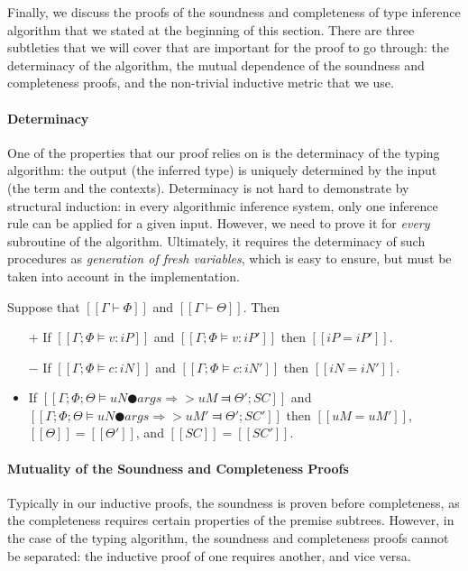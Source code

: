 Finally, we discuss the proofs of the soundness and completeness of type
inference algorithm that we stated at the beginning of this section.
There are three subtleties that we will cover that are important 
for the proof to go through: the determinacy of the algorithm,
the mutual dependence of the soundness and completeness proofs, and
the non-trivial inductive metric that we use.


\paragraph{Determinacy}
    One of the properties that our proof relies on is the determinacy of the 
    typing algorithm: the output (the inferred type)
    is uniquely determined by the input (the term and the contexts).
    Determinacy is not hard to demonstrate by structural induction: 
    in every algorithmic inference system, only one inference rule can be applied 
    for a given input.  However, we need to prove it for \emph{every} 
    subroutine of the algorithm. Ultimately, it requires 
    the determinacy of such procedures as \emph{generation of fresh variables}, 
    which is easy to ensure, but must be taken into account in the implementation.

\begin{lemma*}
    Suppose that $[[Γ ⊢ Φ]]$ and $[[Γ ⊢ Θ]]$. Then 
    \begin{itemize}
        \item [$+$] If $[[Γ; Φ ⊨ v : iP]]$ and $[[Γ; Φ ⊨ v : iP']]$ then $[[iP = iP']]$.
        \item [$-$] If $[[Γ; Φ ⊨ c : iN]]$ and $[[Γ; Φ ⊨ c : iN']]$ then $[[iN = iN']]$.
        \item If $[[Γ; Φ; Θ ⊨ uN ● args ⇒> uM ⫤ Θ'; SC]]$ and 
            $[[Γ; Φ; Θ ⊨ uN ● args ⇒> uM' ⫤ Θ'; SC']]$ then 
            $[[uM = uM']]$, $[[Θ]] = [[Θ']]$, and $[[SC]] =[[SC']]$.  
    \end{itemize}
\end{lemma*}

\paragraph{Mutuality of the Soundness and Completeness Proofs}

Typically in our inductive proofs, the soundness is proven before completeness,
as the completeness requires certain properties of the premise subtrees.
However, in the case of the typing algorithm, the soundness and completeness proofs
cannot be separated: the inductive proof of one requires another, and vice versa. 


